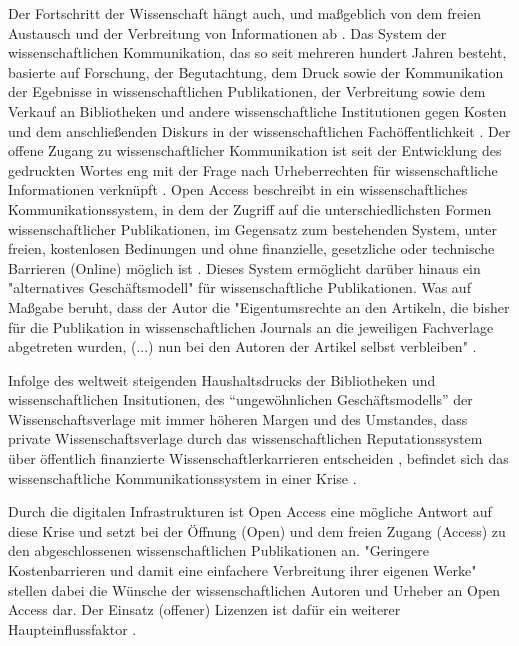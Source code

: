 Der Fortschritt der Wissenschaft hängt auch, und maßgeblich von dem freien Austausch und der Verbreitung von Informationen ab \cite{cite:11}. Das System der wissenschaftlichen Kommunikation, das so seit mehreren hundert Jahren besteht, basierte auf Forschung, der Begutachtung, dem Druck sowie der Kommunikation der Egebnisse in wissenschaftlichen Publikationen, der Verbreitung sowie dem Verkauf an Bibliotheken und andere wissenschaftliche Institutionen gegen Kosten \cite{cite:11a} und dem anschließenden Diskurs in der wissenschaftlichen Fachöffentlichkeit \cite{suchen}. Der offene Zugang zu wissenschaftlicher Kommunikation ist seit der Entwicklung des gedruckten Wortes eng mit der Frage nach Urheberrechten für wissenschaftliche Informationen verknüpft \cite{Case_2000}. Open Access beschreibt in ein wissenschaftliches Kommunikationssystem, in dem der Zugriff auf die unterschiedlichsten Formen wissenschaftlicher Publikationen, im Gegensatz zum bestehenden System, unter freien, kostenlosen Bedinungen und ohne finanzielle, gesetzliche oder technische Barrieren (Online) möglich ist \cite{WD_bundestag_2009}. Dieses System ermöglicht darüber hinaus ein "alternatives Geschäftsmodell"\cite{lewis_2012_inevitability} für wissenschaftliche Publikationen. Was auf Maßgabe beruht, dass der Autor die "Eigentumsrechte an den Artikeln, die bisher für die Publikation in wissenschaftlichen Journals an die jeweiligen Fachverlage abgetreten wurden, (...) nun bei den Autoren der Artikel selbst verbleiben" \cite{Hess_2006}.

Infolge des weltweit steigenden Haushaltsdrucks der Bibliotheken und wissenschaftlichen Insitutionen, des “ungewöhnlichen Geschäftsmodells” \cite{cite:12} der Wissenschaftsverlage mit immer höheren Margen \cite{albert_2006_open_implications} und des Umstandes, dass private Wissenschaftsverlage durch das wissenschaftlichen Reputationssystem über öffentlich finanzierte Wissenschaftlerkarrieren entscheiden \cite{heise_2012}, befindet sich das wissenschaftliche Kommunikationssystem in einer Krise \cite{cite:14}.

Durch die digitalen Infrastrukturen ist Open Access eine mögliche Antwort auf diese Krise und setzt bei der Öffnung (Open) und dem freien Zugang (Access) zu den abgeschlossenen wissenschaftlichen Publikationen an. "Geringere Kostenbarrieren und damit eine einfachere Verbreitung ihrer eigenen Werke" \cite{WD_bundestag_2009} stellen dabei die Wünsche der wissenschaftlichen Autoren und Urheber an Open Access dar. Der Einsatz (offener) Lizenzen ist dafür ein weiterer Haupteinflussfaktor \cite{cite:16}.


